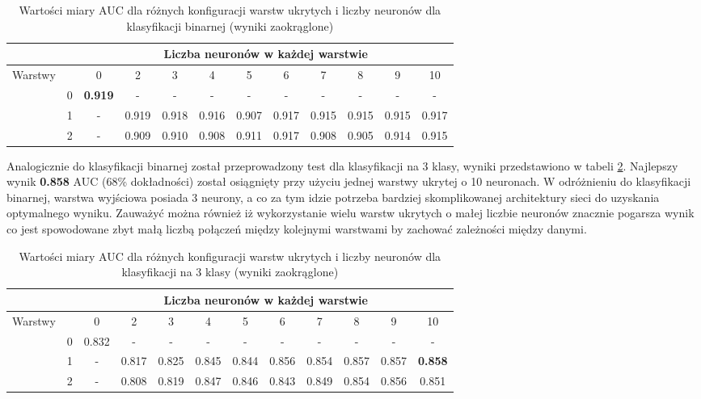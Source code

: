 \documentclass[a4paper, twoside, 11pt, openright]{article}
\begin{document}
\begin{table}[H]
    \centering
    \begin{tabular}{|c|c|c|c|c|c|c|c|c|c|c|c|}
        \hline
         & &  \multicolumn{10}{c|}{Liczba neuronów w każdej warstwie}  \\ \hline
        \multirow{4}{*}{Warstwy} & & 0 & 2 & 3 & 4 & 5 & 6 & 7 & 8 & 9 & 10  \\ \cline{2 - 12}
			& 0 & \textbf{0.919} & - & - & - & - & - & - & - & - & - \\ \cline{2 - 12} 
			& 1 & - &  0.919 &  0.918 &  0.916 &  0.907 &  0.917 &  0.915 &  0.915 &  0.915  & 0.917 \\ \cline{2 - 12} 
			& 2 & - & 0.909 &    0.910 &   0.908 &   0.911 &   0.917 &   0.908 &   0.905 &   0.914 & 0.915 \\ \cline{2 - 12} \hline

    \end{tabular}
    \caption{Wartości miary AUC dla różnych konfiguracji warstw ukrytych i liczby neuronów dla klasyfikacji binarnej (wyniki zaokrąglone)}
    \label{tab:nn_layers_binary}
\end{table}

Analogicznie do klasyfikacji binarnej został przeprowadzony test dla klasyfikacji na 3 klasy, wyniki przedstawiono w tabeli \ref{tab:nn_layers_discrete}. Najlepszy wynik \textbf{0.858} AUC (68\% dokładności) został osiągnięty przy użyciu jednej warstwy ukrytej o 10 neuronach. W odróżnieniu do klasyfikacji binarnej, warstwa wyjściowa posiada 3 neurony, a co za tym idzie potrzeba bardziej skomplikowanej architektury sieci do uzyskania optymalnego wyniku. Zauważyć można również iż wykorzystanie wielu warstw ukrytych o małej liczbie neuronów znacznie pogarsza wynik co jest spowodowane zbyt małą liczbą połączeń między kolejnymi warstwami by zachować zależności między danymi.

\begin{table}[H]
    \centering
    \begin{tabular}{|c|c|c|c|c|c|c|c|c|c|c|c|}
        \hline
         & &  \multicolumn{10}{c|}{Liczba neuronów w każdej warstwie}  \\ \hline
        \multirow{4}{*}{Warstwy} & & 0 & 2 & 3 & 4 & 5 & 6 & 7 & 8 & 9 & 10  \\ \cline{2 - 12}
			& 0 & 0.832 & - & - & - & - & - & - & - & - & - \\ \cline{2 - 12} 
			& 1 & - &  0.817 &  0.825 &  0.845 &  0.844 &  0.856 &  0.854 &  0.857 &  0.857 & \textbf{0.858} \\ \cline{2 - 12} 
			& 2 & - & 0.808 &   0.819 &   0.847 &   0.846 &   0.843 &   0.849 &   0.854 &   0.856 &   0.851  \\ \cline{2 - 12} \hline

    \end{tabular}
    \caption{Wartości miary AUC dla różnych konfiguracji warstw ukrytych i liczby neuronów dla klasyfikacji na 3 klasy (wyniki zaokrąglone)}
    \label{tab:nn_layers_discrete}
\end{table}
\end{document}
